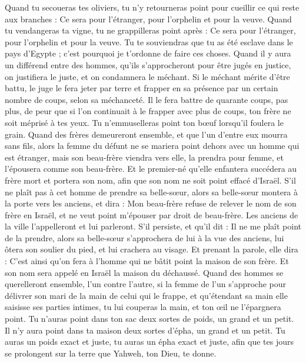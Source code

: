 \begin{multicols}{2}
Quand tu secoueras tes oliviers, tu n'y retourneras point pour cueillir ce qui reste aux branches : Ce sera pour l'étranger, pour l'orphelin et pour la veuve.
Quand tu vendangeras ta vigne, tu ne grappilleras point après : Ce sera pour l'étranger, pour l'orphelin et pour la veuve.
Tu te souviendras que tu as été esclave dans le pays d'Egypte ; c'est pourquoi je t’ordonne de faire ces choses.
\VerseOne{}Quand il y aura un différend entre des hommes, qu'ils s’approcheront pour être jugés en justice, on justifiera le juste, et on condamnera le méchant.
Si le méchant mérite d'être battu, le juge le fera jeter par terre et frapper en sa présence par un certain nombre de coups, selon sa méchanceté.
Il le fera battre de quarante coups, pas plus, de peur que si l’on continuait à le frapper avec plus de coups, ton frère ne soit méprisé à tes yeux.
Tu n'emmuselleras point ton bœuf lorsqu'il foulera le grain.
Quand des frères demeureront ensemble, et que l'un d'entre eux mourra sans fils, alors la femme du défunt ne se mariera point dehors avec un homme qui est étranger, mais son beau-frère viendra vers elle, la prendra pour femme, et l'épousera comme son beau-frère.
Et le premier-né qu'elle enfantera succédera au frère mort et portera son nom, afin que son nom ne soit point effacé d'Israël.
S'il ne plaît pas à cet homme de prendre sa belle-sœur, alors sa belle-sœur montera à la porte vers les anciens, et dira : Mon beau-frère refuse de relever le nom de son frère en Israël, et ne veut point m'épouser par droit de beau-frère.
Les anciens de la ville l'appelleront et lui parleront. S'il persiste, et qu'il dit : Il ne me plaît point de la prendre,
alors sa belle-sœur s'approchera de lui à la vue des anciens, lui ôtera son soulier du pied, et lui crachera au visage. Et prenant la parole, elle dira : C'est ainsi qu'on fera à l'homme qui ne bâtit point la maison de son frère.
Et son nom sera appelé en Israël la maison du déchaussé.
Quand des hommes se querelleront ensemble, l'un contre l'autre, si la femme de l'un s'approche pour délivrer son mari de la main de celui qui le frappe, et qu'étendant sa main elle saisisse ses parties intimes,
tu lui couperas la main, et ton œil ne l'épargnera point.
Tu n'auras point dans ton sac deux sortes de poids, un grand et un petit.
Il n'y aura point dans ta maison deux sortes d'épha, un grand et un petit.
Tu auras un poids exact et juste, tu auras un épha exact et juste, afin que tes jours se prolongent sur la terre que Yahweh, ton Dieu, te donne.

\end{multicols}
